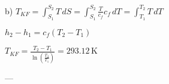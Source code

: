 b) \( T_{KF} = \int_{S_1}^{S_2} T \, dS = \int_{S_1}^{S_2} \frac{T}{c_f} c_f \, dT = \int_{T_1}^{T_2} T \, dT \)  

\( h_2 - h_1 = c_f (T_2 - T_1) \)  

\( T_{KF} = \frac{T_2 - T_1}{\ln \left( \frac{T_2}{T_1} \right)} = 293.12 \, \text{K} \)  

---